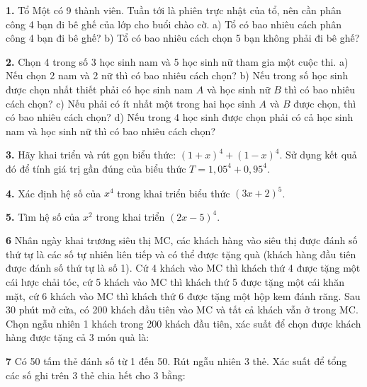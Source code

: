 \documentclass[12pt,a4paper]{extarticle}
\begin{document}
\onehalfspacing

\makeheadbox[headerright={Tổng ôn 10-11},chude={CHỦ ĐỀ 06},tieude={Xác suất cơ bản},dinhdang={Đại số},lop={12 },gv={Nguyễn Lê Minh Ngọc}]
\noindent\textbf{1.} Tổ Một có 9 thành viên. Tuần tới là phiên trực nhật của tổ, nên cần phân công 4 bạn đi bê ghế của lớp cho buổi chào cờ.
\noindent a) Tổ có bao nhiêu cách phân công 4 bạn đi bê ghế?
\noindent b) Tổ có bao nhiêu cách chọn 5 bạn không phải đi bê ghế?
\vspace{0.4cm}

\noindent\textbf{2.} Chọn 4 trong số 3 học sinh nam và 5 học sinh nữ tham gia một cuộc thi.
\noindent a) Nếu chọn 2 nam và 2 nữ thì có bao nhiêu cách chọn?
\noindent b) Nếu trong số học sinh được chọn nhất thiết phải có học sinh nam $A$ và học sinh nữ $B$ thì có bao nhiêu cách chọn?
\noindent c) Nếu phải có ít nhất một trong hai học sinh $A$ và $B$ được chọn, thì có bao nhiêu cách chọn?
\noindent d) Nếu trong 4 học sinh được chọn phải có cả học sinh nam và học sinh nữ thì có bao nhiêu cách chọn?

\noindent\textbf{3.} Hãy khai triển và rút gọn biểu thức: $(1 + x)^4 + (1 - x)^4$. Sử dụng kết quả đó để tính giá trị gần đúng của biểu thức $T = 1{,}05^4 + 0{,}95^4$.

\noindent\textbf{4.} Xác định hệ số của $x^4$ trong khai triển biểu thức $(3x + 2)^5$.

\noindent\textbf{5.} Tìm hệ số của $x^2$ trong khai triển $(2x - 5)^4$.

\noindent\textbf{6} Nhân ngày khai trương siêu thị MC, các khách hàng vào siêu thị được đánh số thứ tự là các số tự nhiên liên tiếp và có thể được tặng quà (khách hàng đầu tiên được đánh số thứ tự là số 1). Cứ 4 khách vào MC thì khách thứ 4 được tặng một cái lược chải tóc, cứ 5 khách vào MC thì khách thứ 5 được tặng một cái khăn mặt, cứ 6 khách vào MC thì khách thứ 6 được tặng một hộp kem đánh răng. Sau 30 phút mở cửa, có 200 khách đầu tiên vào MC và tất cả khách vẫn ở trong MC. Chọn ngẫu nhiên 1 khách trong 200 khách đầu tiên, xác suất để chọn được khách hàng được tặng cả 3 món quà là:

\noindent\textbf{7} Có 50 tấm thẻ đánh số từ 1 đến 50. Rút ngẫu nhiên 3 thẻ. Xác suất để tổng các số ghi trên 3 thẻ chia hết cho 3 bằng:
\end{document}
